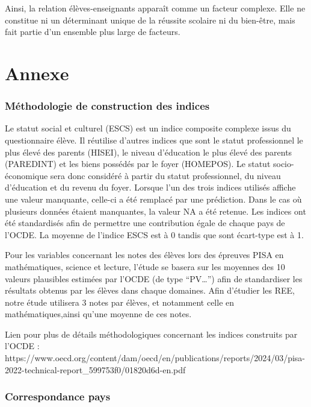 \documentclass[
  french,
  11pt,
  a4paper,
  oneside]{report}
\begin{document}
Ainsi, la relation élèves-enseignants apparaît comme un facteur
complexe. Elle ne constitue ni un déterminant unique de la réussite
scolaire ni du bien-être, mais fait partie d'un ensemble plus large de
facteurs.

\chapter{Annexe}\label{annexe}

\subsection{Méthodologie de construction des
indices}\label{muxe9thodologie-de-construction-des-indices}

Le statut social et culturel (ESCS) est un indice composite complexe
issus du questionnaire élève. Il réutilise d'autres indices que sont le
statut professionnel le plus élevé des parents (HISEI), le niveau
d'éducation le plus élevé des parents (PAREDINT) et les biens possédés
par le foyer (HOMEPOS). Le statut socio-économique sera donc considéré à
partir du statut professionnel, du niveau d'éducation et du revenu du
foyer. Lorsque l'un des trois indices utilisés affiche une valeur
manquante, celle-ci a été remplacé par une prédiction. Dans le cas où
plusieurs données étaient manquantes, la valeur NA a été retenue. Les
indices ont été standardisés afin de permettre une contribution égale de
chaque pays de l'OCDE. La moyenne de l'indice ESCS est à 0 tandis que
sont écart-type est à 1.

Pour les variables concernant les notes des élèves lors des épreuves
PISA en mathématiques, science et lecture, l'étude se basera sur les
moyennes des 10 valeurs plausibles estimées par l'OCDE (de type
``PV\ldots'') afin de standardiser les résultats obtenus par les élèves
dans chaque domaines. Afin d'étudier les REE, notre étude utilisera 3
notes par élèves, et notamment celle en mathématiques,ainsi qu'une
moyenne de ces notes.

Lien pour plus de détails méthodologiques concernant les indices
construits par l'OCDE :
https://www.oecd.org/content/dam/oecd/en/publications/reports/2024/03/pisa-2022-technical-report\_599753f0/01820d6d-en.pdf

\subsection{Correspondance pays}\label{correspondance-pays}
\end{document}

